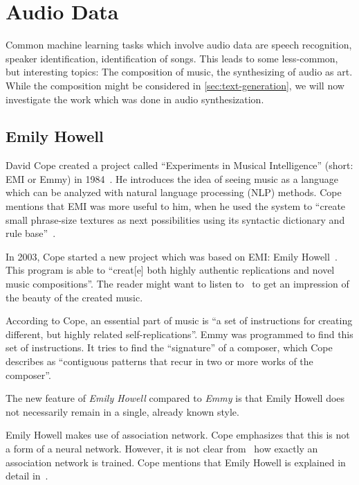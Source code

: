 
\section{Audio Data}
\label{sec:music}

Common machine learning tasks which involve audio data are speech recognition,
speaker identification, identification of songs. This leads to some
less-common, but interesting topics: The composition of music, the synthesizing
of audio as art. While the composition might be considered in
\cref{sec:text-generation}, we will now investigate the work which was done in
audio synthesization.


\subsection{Emily Howell}
David Cope created a project called \enquote{Experiments in Musical
Intelligence} (short: EMI or Emmy) in 1984~\cite{Cope1987}. He introduces the idea of
seeing music as a language which can be analyzed with natural language
processing (NLP) methods. Cope mentions that EMI was more useful to him, when
he used the system to \enquote{create small phrase-size textures as next
possibilities using its syntactic dictionary and rule base}~\cite{Cope1987}.

In 2003, Cope started a new project which was based on EMI: Emily
Howell~\cite{cope2013well}. This program is able to \enquote{creat[e] both
highly authentic replications and novel music compositions}. The reader might
want to listen to~\cite{Cope2012} to get an impression of the beauty of the
created music.

According to Cope, an essential part of music is \enquote{a set of instructions
for creating different, but highly related self-replications}. Emmy was
programmed to find this set of instructions. It tries to find the
\enquote{signature} of a composer, which Cope describes as \enquote{contiguous
patterns that recur in two or more works of the composer}.

The new feature of \textit{Emily Howell} compared to \textit{Emmy} is that
Emily Howell does not necessarily remain in a single, already known style.

Emily Howell makes use of association network. Cope emphasizes that this is not
a form of a neural network. However, it is not clear from~\cite{cope2013well}
how exactly an association network is trained. Cope mentions that Emily
Howell is explained in detail in~\cite{cope2005computer}.


